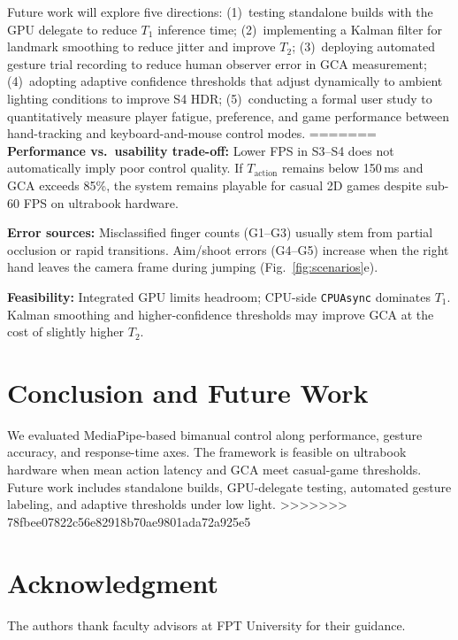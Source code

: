 \documentclass[journal,onecolumn,12pt,draftclsnofoot]{IEEEtran}
\begin{document}
\begin{itemize}
Future work will explore five directions: (1)~testing standalone builds with the GPU delegate to reduce $T_1$ inference time; (2)~implementing a Kalman filter for landmark smoothing to reduce jitter and improve $T_2$; (3)~deploying automated gesture trial recording to reduce human observer error in GCA measurement; (4)~adopting adaptive confidence thresholds that adjust dynamically to ambient lighting conditions to improve S4 HDR; (5)~conducting a formal user study to quantitatively measure player fatigue, preference, and game performance between hand-tracking and keyboard-and-mouse control modes.
=======
\textbf{Performance vs.\ usability trade-off:} Lower FPS in S3--S4 does not automatically imply poor control quality. If $T_{\text{action}}$ remains below 150\,ms and GCA exceeds 85\%, the system remains playable for casual 2D games despite sub-60 FPS on ultrabook hardware.

\textbf{Error sources:} Misclassified finger counts (G1--G3) usually stem from partial occlusion or rapid transitions. Aim/shoot errors (G4--G5) increase when the right hand leaves the camera frame during jumping (Fig.~\ref{fig:scenarios}e).

\textbf{Feasibility:} Integrated GPU limits headroom; CPU-side \texttt{CPUAsync} dominates $T_1$. Kalman smoothing and higher-confidence thresholds may improve GCA at the cost of slightly higher $T_2$.

\section{Conclusion and Future Work}
We evaluated MediaPipe-based bimanual control along performance, gesture accuracy, and response-time axes. The framework is feasible on ultrabook hardware when mean action latency and GCA meet casual-game thresholds. Future work includes standalone builds, GPU-delegate testing, automated gesture labeling, and adaptive thresholds under low light.
>>>>>>> 78fbee07822c56e82918b70ae9801ada72a925e5

\section*{Acknowledgment}
The authors thank faculty advisors at FPT University for their guidance.


\end{itemize}
\end{document}
